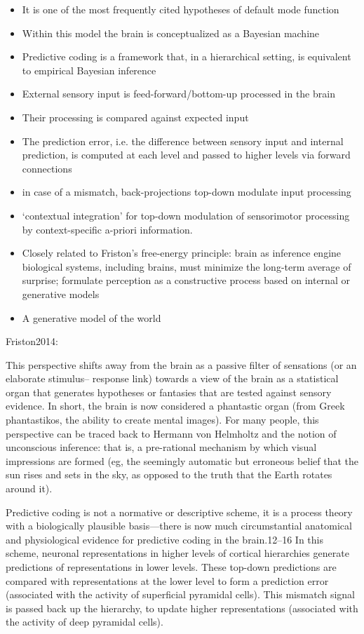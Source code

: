 \documentclass{article} %
\begin{document}
\begin{itemize}
  \item It is one of the most frequently cited hypotheses of default mode function
  \item Within this model the brain is conceptualized as a Bayesian machine
  \item Predictive coding is a framework that, in a hierarchical setting,
  is equivalent to empirical Bayesian inference
  \item External sensory input is feed-forward/bottom-up processed in the brain
  \item Their processing is compared against expected input
  \item The prediction error, i.e. the difference between sensory input
  and internal prediction, is computed at each level and passed to
  higher levels via forward connections
  \item in case of a mismatch, back-projections top-down modulate
  input processing
  \item ‘contextual integration’ for top-down modulation of sensorimotor
  processing by context-specific a-priori information.
  \item Closely related to Friston's free-energy principle: brain as inference engine
  biological systems, including brains, must minimize the long-term average of surprise;
  formulate perception as a constructive process based on internal or generative models
  \item A generative model of the world
\end{itemize}

Friston2014:

This perspective shifts away from the brain as a passive filter of sensations (or an elaborate stimulus– response link) towards a view of the brain as a statistical organ that generates hypotheses or fantasies that are tested against sensory evidence. In short, the brain is now considered a phantastic organ (from Greek phantastikos, the ability to create mental images). For many people, this perspective can be traced back to Hermann von Helmholtz and the notion of unconscious inference: that is, a pre-rational mechanism by which visual impressions are formed (eg, the seemingly automatic but erroneous belief that the sun rises and sets in the sky, as opposed to the truth that the Earth rotates around it).

Predictive coding is not a normative or descriptive scheme, it is a process theory with a biologically plausible basis—there is now much circumstantial anatomical and physiological evidence for predictive coding in the brain.12–16 In this scheme, neuronal representations in higher levels of cortical hierarchies generate predictions of representations in lower levels. These top-down predictions are compared with representations at the lower level to form a prediction
error (associated with the activity of superficial pyramidal cells). This mismatch signal is passed back up the hierarchy, to update higher representations (associated with the activity of deep pyramidal cells).
\end{document}
